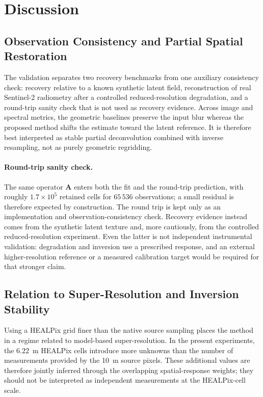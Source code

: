 \documentclass[journal]{IEEEtran}
\newcommand{\healpix}{HEALPix\xspace}
\begin{document}
\section{Discussion}

\subsection{Observation Consistency and Partial Spatial Restoration}
\label{sec:roundtrip_interpretation}

The validation separates two recovery benchmarks from one auxiliary
consistency check: recovery relative to a known synthetic latent field,
reconstruction of real Sentinel-2 radiometry after a controlled
reduced-resolution degradation, and a round-trip sanity check that is not
used as recovery evidence. Across image and spectral
metrics, the geometric baselines preserve the input blur whereas
the proposed method shifts the estimate toward the latent reference.
It is therefore best interpreted as stable partial deconvolution
combined with inverse resampling, not as purely geometric regridding.

\paragraph{Round-trip sanity check.}
The same operator $\mathbf A$ enters both the fit and the round-trip
prediction, with roughly $1.7\times10^{5}$ retained cells for $65\,536$
observations; a small residual is therefore expected by construction. The
round trip is kept only as an implementation and observation-consistency
check. Recovery evidence instead comes from the synthetic latent texture and,
more cautiously, from the controlled reduced-resolution experiment. Even the
latter is not independent instrumental validation: degradation and inversion
use a prescribed response, and an external higher-resolution reference or a
measured calibration target would be required for that stronger claim.

\subsection{Relation to Super-Resolution and Inversion Stability}

Using a \healpix grid finer than the native source sampling places
the method in a regime related to model-based super-resolution.
In the present experiments, the $6.22$~m \healpix cells
introduce more unknowns than the number of measurements provided
by the 10~m source pixels. These additional values are therefore
jointly inferred through the overlapping spatial-response weights;
they should not be interpreted as independent measurements at the
\healpix-cell scale.
\end{document}
